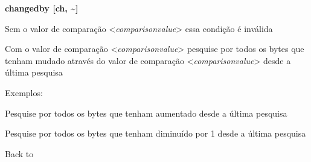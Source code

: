 \documentclass[letterpaper,10pt,brazil]{sphinxmanual}
\begin{document}
\begin{DUlineblock}{0em}
\item[]
\begin{DUlineblock}{\DUlineblockindent}
\item[] \textbf{changedby {[}ch, \textasciitilde{}{]}}
\item[] 
\end{DUlineblock}
\item[] Sem o valor de comparação \textless{}\emph{comparisonvalue}\textgreater{} essa condição é inválida
\item[] Com o valor de comparação \textless{}\emph{comparisonvalue}\textgreater{} pesquise por todos os bytes que tenham mudado através do valor de comparação \textless{}\emph{comparisonvalue}\textgreater{} desde a última pesquisa
\item[] 
\item[] 
\item[] Exemplos:
\item[] 
\item[]
\begin{DUlineblock}{\DUlineblockindent}
\item[] 
\item[] 
\end{DUlineblock}
\item[] Pesquise por todos os bytes que tenham aumentado desde a última pesquisa
\item[] 
\item[]
\begin{DUlineblock}{\DUlineblockindent}
\item[] 
\item[] 
\end{DUlineblock}
\item[] Pesquise por todos os bytes que tenham diminuído por 1 desde a última pesquisa
\item[] 
\item[] Back to {\hyperref[debugger/cheats:debugger\string-cheats\string-list]{}}
\end{DUlineblock}
\begin{quote}
\label{debugger/cheats:debugger-command-cheatnextf}\end{quote}
\end{document}
